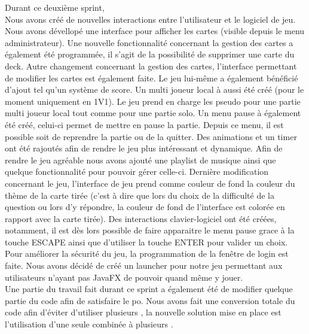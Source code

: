 Durant ce deuxième sprint,\\
Nous avons créé de nouvelles interactions entre l'utilisateur et le logiciel de jeu.
Nous avons dévellopé une interface pour afficher les cartes (visible depuis le menu administrateur).
Une nouvelle fonctionnalité concernant la gestion des cartes a également été programmée, il s'agit de la possibilité de supprimer une carte du deck.
Autre changement concernant la gestion des cartes, l'interface permettant de modifier les cartes est également faite.
Le jeu lui-même a également bénéficié d'ajout tel qu'un système de score.
Un multi joueur local à aussi été créé (pour le moment uniquement en 1V1).
Le jeu prend en charge les pseudo pour une partie multi joueur local tout comme pour une partie solo.
Un menu pause à également été créé, celui-ci permet de mettre en pause la partie.
Depuis ce menu, il est possible soit de reprendre la partie ou de la quitter.
Des animations et un timer ont été rajoutés afin de rendre le jeu plus intéressant et dynamique.
Afin de rendre le jeu agréable nous avons ajouté une playlist de musique ainsi que quelque fonctionnalité pour pouvoir gérer celle-ci.
Dernière modification concernant le jeu, l'interface de jeu prend comme couleur de fond la couleur du thème de la carte tirée (c'est à dire que lors du choix de la difficulté de la question ou lors d'y répondre, la couleur de fond de l'interface est colorée en rapport avec la carte tirée).
Des interactions clavier-logiciel ont été créées, notamment, il est dès lors possible de faire apparaitre le menu pause grace à la touche ESCAPE ainsi que d'utiliser la touche ENTER pour valider un choix.
Pour améliorer la sécurité du jeu, la programmation de la fenêtre de login est faite.
Nous avons décidé de créé un launcher pour notre jeu permettant aux utilisateurs n'ayant pas JavaFX de pouvoir quand même y jouer.\\
Une partie du travail fait durant ce sprint a également été de modifier quelque partie du code afin de satisfaire le \acrshort{po}.
Nous avons fait une conversion totale du code afin d'éviter d'utiliser plusieurs , la nouvelle solution mise en place est l'utilisation d'une seule  combinée à plusieurs .  
